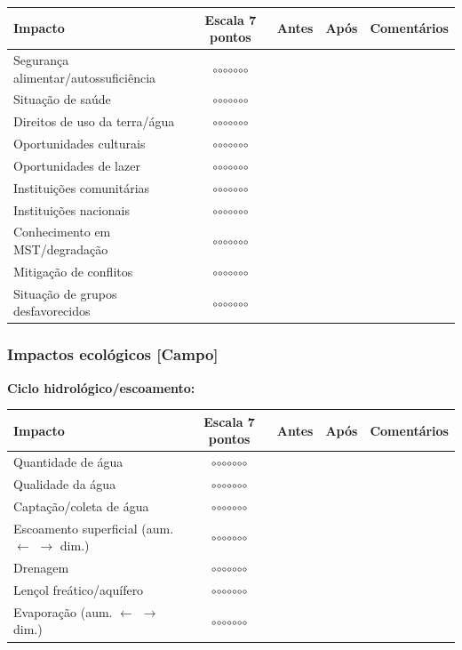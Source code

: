 {
\begin{longtable}[]{@{}lcccl@{}}
\toprule\noalign{}
Impacto & Escala 7 pontos & Antes & Após & Comentários \\
\midrule\noalign{}
\endhead
\bottomrule\noalign{}
\endlastfoot
Segurança alimentar/autossuficiência & $\circ$$\circ$$\circ$$\circ$$\circ$$\circ$$\circ$ & & & \\
Situação de saúde & $\circ$$\circ$$\circ$$\circ$$\circ$$\circ$$\circ$ & & & \\
Direitos de uso da terra/água & $\circ$$\circ$$\circ$$\circ$$\circ$$\circ$$\circ$ & & & \\
Oportunidades culturais & $\circ$$\circ$$\circ$$\circ$$\circ$$\circ$$\circ$ & & & \\
Oportunidades de lazer & $\circ$$\circ$$\circ$$\circ$$\circ$$\circ$$\circ$ & & & \\
Instituições comunitárias & $\circ$$\circ$$\circ$$\circ$$\circ$$\circ$$\circ$ & & & \\
Instituições nacionais & $\circ$$\circ$$\circ$$\circ$$\circ$$\circ$$\circ$ & & & \\
Conhecimento em MST/degradação & $\circ$$\circ$$\circ$$\circ$$\circ$$\circ$$\circ$ & & & \\
Mitigação de conflitos & $\circ$$\circ$$\circ$$\circ$$\circ$$\circ$$\circ$ & & & \\
Situação de grupos desfavorecidos & $\circ$$\circ$$\circ$$\circ$$\circ$$\circ$$\circ$ & & & \\
\end{longtable}
}

\subsubsection{Impactos ecológicos {[Campo]}}\label{impactos-ecoluxf3gicos}

\textbf{Ciclo hidrológico/escoamento:}

{
\begin{longtable}[]{@{}lcccl@{}}
\toprule\noalign{}
Impacto & Escala 7 pontos & Antes & Após & Comentários \\
\midrule\noalign{}
\endhead
\bottomrule\noalign{}
\endlastfoot
Quantidade de água & $\circ$$\circ$$\circ$$\circ$$\circ$$\circ$$\circ$ & & & \\
Qualidade da água & $\circ$$\circ$$\circ$$\circ$$\circ$$\circ$$\circ$ & & & \\
Captação/coleta de água & $\circ$$\circ$$\circ$$\circ$$\circ$$\circ$$\circ$ & & & \\
Escoamento superficial (aum. $\leftarrow$ $\rightarrow$ dim.) & $\circ$$\circ$$\circ$$\circ$$\circ$$\circ$$\circ$ & & & \\
Drenagem & $\circ$$\circ$$\circ$$\circ$$\circ$$\circ$$\circ$ & & & \\
Lençol freático/aquífero & $\circ$$\circ$$\circ$$\circ$$\circ$$\circ$$\circ$ & & & \\
Evaporação (aum. $\leftarrow$ $\rightarrow$ dim.) & $\circ$$\circ$$\circ$$\circ$$\circ$$\circ$$\circ$ & & & \\
\end{longtable}
}

